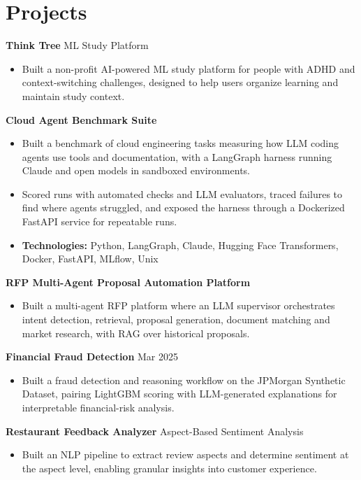 \documentclass[10pt,a4paper]{article}
\begin{document}
\section{Projects}
\textbf{Think Tree} \textbar{} ML Study Platform\par
\begin{itemize}
  \item Built a non-profit AI-powered ML study platform for people with ADHD and context-switching challenges, designed to help users organize learning and maintain study context.
\end{itemize}
\textbf{Cloud Agent Benchmark Suite}\par
\begin{itemize}
  \item Built a benchmark of cloud engineering tasks measuring how LLM coding agents use tools and documentation, with a LangGraph harness running Claude and open models in sandboxed environments.
  \item Scored runs with automated checks and LLM evaluators, traced failures to find where agents struggled, and exposed the harness through a Dockerized FastAPI service for repeatable runs.
  \item \textbf{Technologies:} Python, LangGraph, Claude, Hugging Face Transformers, Docker, FastAPI, MLflow, Unix
\end{itemize}
\textbf{RFP Multi-Agent Proposal Automation Platform}\par
\begin{itemize}
  \item Built a multi-agent RFP platform where an LLM supervisor orchestrates intent detection, retrieval, proposal generation, document matching and market research, with RAG over historical proposals.
\end{itemize}
\textbf{Financial Fraud Detection} \textbar{} Mar 2025\par
\begin{itemize}
  \item Built a fraud detection and reasoning workflow on the JPMorgan Synthetic Dataset, pairing LightGBM scoring with LLM-generated explanations for interpretable financial-risk analysis.
\end{itemize}
\textbf{Restaurant Feedback Analyzer} \textbar{} Aspect-Based Sentiment Analysis\par
\begin{itemize}
  \item Built an NLP pipeline to extract review aspects and determine sentiment at the aspect level, enabling granular insights into customer experience.
\end{itemize}
\end{document}
